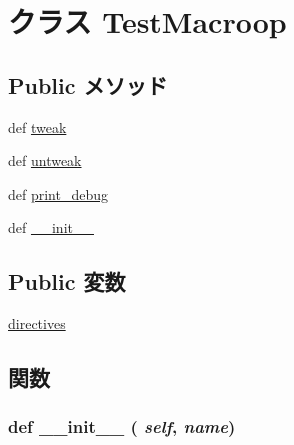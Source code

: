 \hypertarget{classmicro__asm__test_1_1TestMacroop}{
\section{クラス TestMacroop}
\label{classmicro__asm__test_1_1TestMacroop}
}
\subsection*{Public メソッド}
\begin{DoxyCompactItemize}
\item 
def \hyperlink{classmicro__asm__test_1_1TestMacroop_a65da197345d4ff5f07a39c9f12d92ad9}{tweak}
\item 
def \hyperlink{classmicro__asm__test_1_1TestMacroop_a5098685e7817bc3cae439b2f554c6f09}{untweak}
\item 
def \hyperlink{classmicro__asm__test_1_1TestMacroop_a21b9cd12cd06f03543452bb453dcd0dd}{print\_\-debug}
\item 
def \hyperlink{classmicro__asm__test_1_1TestMacroop_ac775ee34451fdfa742b318538164070e}{\_\-\_\-init\_\-\_\-}
\end{DoxyCompactItemize}
\subsection*{Public 変数}
\begin{DoxyCompactItemize}
\item 
\hyperlink{classmicro__asm__test_1_1TestMacroop_a6b7cf57f95798ede8f3b8f2c4100f7c3}{directives}
\end{DoxyCompactItemize}


\subsection{関数}
\hypertarget{classmicro__asm__test_1_1TestMacroop_ac775ee34451fdfa742b318538164070e}{
\subsubsection[{\_\-\_\-init\_\-\_\-}]{\setlength{\rightskip}{0pt plus 5cm}def \_\-\_\-init\_\-\_\- ( {\em self}, \/   {\em name})}}
\label{classmicro__asm__test_1_1TestMacroop_ac775ee34451fdfa742b318538164070e}



